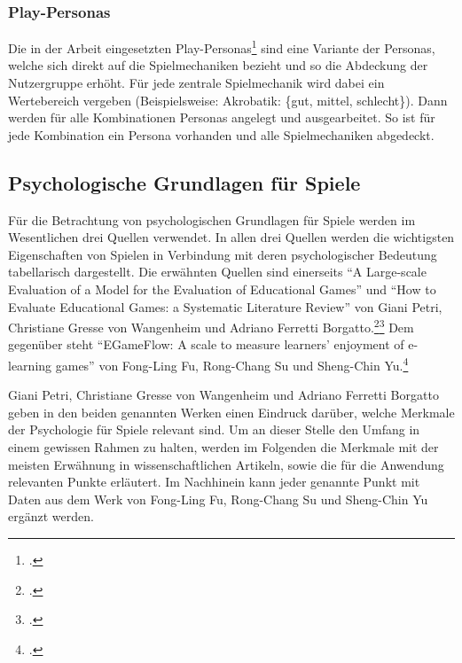 	\subsubsection{Play-Personas}
		Die in der Arbeit eingesetzten Play-Personas\footcite{play-persona} sind eine Variante der Personas, welche sich direkt auf die Spielmechaniken bezieht und so die Abdeckung der Nutzergruppe erhöht. Für jede zentrale Spielmechanik wird dabei ein Wertebereich vergeben (Beispielsweise: Akrobatik: \{gut, mittel, schlecht\}). Dann werden für alle Kombinationen Personas angelegt und ausgearbeitet. So ist für jede Kombination ein Persona vorhanden und alle Spielmechaniken abgedeckt.

\subsection{Psychologische Grundlagen für Spiele}\label{ssec:psycho-grundlagen}
	Für die Betrachtung von psychologischen Grundlagen für Spiele werden im Wesentlichen drei Quellen verwendet. In allen drei Quellen werden die wichtigsten Eigenschaften von Spielen in Verbindung mit deren psychologischer Bedeutung tabellarisch dargestellt.
	Die erwähnten Quellen sind einerseits  \enquote{A Large-scale Evaluation of a Model for the Evaluation of Educational Games} und \enquote{How to Evaluate Educational Games: a Systematic Literature Review} von Giani Petri, Christiane Gresse von Wangenheim und Adriano Ferretti Borgatto.\footcite{psych1}\footcite{psych3} Dem gegenüber steht \enquote{EGameFlow: A scale to measure learners' enjoyment of e-learning games} von Fong-Ling Fu, Rong-Chang Su und Sheng-Chin Yu.\footcite{psych2}

	Giani Petri, Christiane Gresse von Wangenheim und Adriano Ferretti Borgatto geben in den beiden genannten Werken einen Eindruck darüber, welche Merkmale der Psychologie für Spiele relevant sind. Um an dieser Stelle den Umfang in einem gewissen Rahmen zu halten, werden im Folgenden die Merkmale mit der meisten Erwähnung in wissenschaftlichen Artikeln, sowie die für die Anwendung relevanten Punkte erläutert. Im Nachhinein kann jeder genannte Punkt mit Daten aus dem Werk von Fong-Ling Fu, Rong-Chang Su und Sheng-Chin Yu ergänzt werden.

